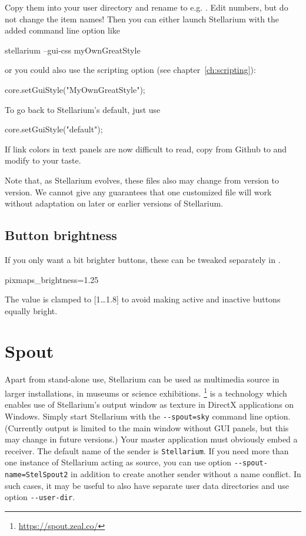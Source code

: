 Copy them into your user directory
and rename to e.g. . Edit numbers, but do
not change the item names! Then you can either launch Stellarium with
the added command line option like
\begin{commands}
  stellarium --gui-css myOwnGreatStyle
\end{commands}
or you could also use the scripting option (see chapter~\ref{ch:scripting}):
\begin{script}
  core.setGuiStyle("MyOwnGreatStyle");
\end{script}
To go back to Stellarium's default, just use
\begin{script}
  core.setGuiStyle("default");
\end{script}

If link colors in text panels are now difficult to read, copy
 from Github to
 and modify to your taste.

Note that, as Stellarium evolves, these files also may change from
version to version. We cannot give any guarantees that one customized
file will work without adaptation on later or earlier versions of Stellarium.

\subsection{Button brightness}
\label{sec:CommandLineOptions:Special:ButtonBrightness}
If you only want a bit brighter buttons, these can be tweaked separately in .
\begin{configfile}
[gui]
pixmaps_brightness=1.25
\end{configfile}
The value is clamped to [1\ldots1.8] to avoid making active and inactive buttons equally bright.


\section{Spout} 
\label{sec:CommandLineOptions:Special:Spout}
Apart from stand-alone use, Stellarium can be used as multimedia source in larger installations, in museums or science exhibitions. 
\footnote{\url{https://spout.zeal.co/}} is a technology which enables use of Stellarium's 
output window as texture in DirectX applications on Windows. Simply start Stellarium with 
the \texttt{-\/-spout=sky} command line option. (Currently  output is limited to the main window 
without GUI panels, but this may change in future versions.) 
Your master application must obviously embed a  receiver. 
The default name of the  sender is \texttt{Stellarium}. If you need more than one instance of Stellarium acting as source, 
you can use option \texttt{-\/-spout-name=StelSpout2} in addition to create another  sender without a name conflict. 
In such cases, it may be useful to also have separate user data directories and use option \texttt{-\/-user-dir}. 


